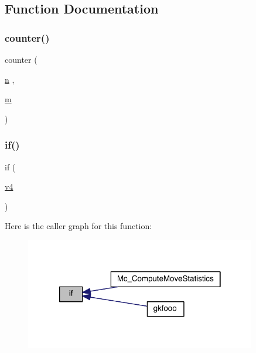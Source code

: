 \subsection{Function Documentation}
\mbox{\label{a00563_a22845a91f919051f5ce10e0fc468c821}} 
\subsubsection{\texorpdfstring{counter()}{counter()}}
{\footnotesize\ttfamily counter (\begin{DoxyParamCaption}\item[{\hyperlink{a00623_a781a04ab095280f838ff3eb0e51312e0}{n}}]{,  }\item[{\hyperlink{a00575_ab780b65adc28bca17f186bf3eebfb21d}{m}}]{ }\end{DoxyParamCaption})}

\mbox{\label{a00563_ae338c28baa2c1bd1c7f9308a222c880f}} 
\subsubsection{\texorpdfstring{if()}{if()}}
{\footnotesize\ttfamily if (\begin{DoxyParamCaption}\item[{\hyperlink{a00563_aaa05ec51c2d691a0b7560a330374e1c4}{v4}}]{ }\end{DoxyParamCaption})}

Here is the caller graph for this function\+:\nopagebreak
\begin{figure}[H]
\begin{center}
\leavevmode
\includegraphics[width=286pt]{a00563_ae338c28baa2c1bd1c7f9308a222c880f_icgraph}
\end{center}
\end{figure}
\mbox{\label{a00563_af37c7e7d7baefebf97f9b18e437d3a0b}} 
